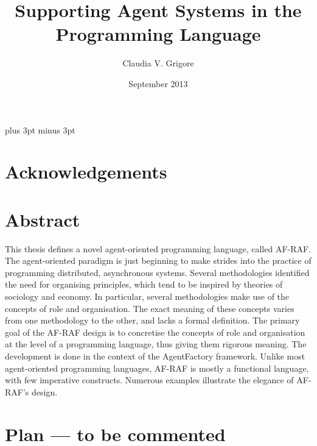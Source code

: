 \documentclass[a4paper,12pt,oneside,fleqn]{book} %
\theoremstyle{plain}
\theoremstyle{definition}
\theoremstyle{remark}
\begin{document}
\overfullrule=5pt   %
\title{Supporting Agent Systems in the Programming Language} %
\author{Claudia V. Grigore}
\date{September 2013}
\maketitle

\tableofcontents
\listoffigures
\listoftables
\baselineskip=21.75pt
\parskip=3pt plus 3pt minus 3pt
\chapter*{Acknowledgements} %

\chapter*{Abstract} %

This thesis defines a novel agent-oriented programming language, called
AF-RAF\null.  The agent-oriented paradigm is just beginning to make strides
into the practice of programming distributed, asynchronous systems.
Several methodologies identified the need for organising principles, which
tend to be inspired by theories of sociology and economy.  In particular,
several methodologies make use of the concepts of role and organisation.
The exact meaning of these concepts varies from one methodology to the
other, and lacks a formal definition.  The primary goal of the AF-RAF
design is to concretise the concepts of role and organisation at the level
of a programming language, thus giving them rigorous meaning. The
development is done in the context of the AgentFactory framework.  Unlike
most agent-oriented programming languages, AF-RAF is mostly a functional
language, with few imperative constructs.  Numerous examples illustrate the
elegance of AF-RAF's design.


\chapter*{Plan --- to be commented} %
\end{document}
